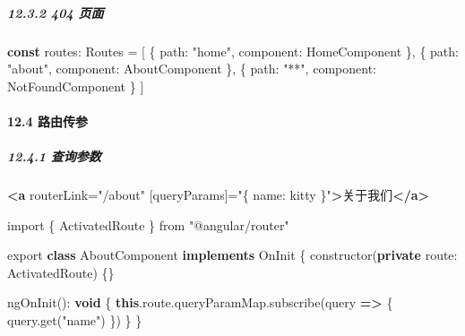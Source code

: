 \documentclass[
]{article}
\newenvironment{Shaded}{}{}
\newcommand{\AttributeTok}[1]{\textcolor[rgb]{0.49,0.56,0.16}{#1}}
\newcommand{\DataTypeTok}[1]{\textcolor[rgb]{0.56,0.13,0.00}{#1}}
\newcommand{\FunctionTok}[1]{\textcolor[rgb]{0.02,0.16,0.49}{#1}}
\newcommand{\ImportTok}[1]{#1}
\newcommand{\KeywordTok}[1]{\textcolor[rgb]{0.00,0.44,0.13}{\textbf{#1}}}
\newcommand{\NormalTok}[1]{#1}
\newcommand{\OperatorTok}[1]{\textcolor[rgb]{0.40,0.40,0.40}{#1}}
\newcommand{\OtherTok}[1]{\textcolor[rgb]{0.00,0.44,0.13}{#1}}
\newcommand{\StringTok}[1]{\textcolor[rgb]{0.25,0.44,0.63}{#1}}
\begin{document}
\hypertarget{1232-404-ux9875ux9762}{%
\subparagraph{12.3.2 404 页面}\label{1232-404-ux9875ux9762}}

\begin{Shaded}
\begin{Highlighting}[]
\KeywordTok{const}\NormalTok{ routes}\OperatorTok{:}\NormalTok{ Routes }\OperatorTok{=}\NormalTok{ [}
\NormalTok{  \{}
    \DataTypeTok{path}\OperatorTok{:} \StringTok{"home"}\OperatorTok{,}
    \DataTypeTok{component}\OperatorTok{:}\NormalTok{ HomeComponent}
\NormalTok{  \}}\OperatorTok{,}
\NormalTok{  \{}
    \DataTypeTok{path}\OperatorTok{:} \StringTok{"about"}\OperatorTok{,}
    \DataTypeTok{component}\OperatorTok{:}\NormalTok{ AboutComponent}
\NormalTok{  \}}\OperatorTok{,}
\NormalTok{  \{}
    \DataTypeTok{path}\OperatorTok{:} \StringTok{"**"}\OperatorTok{,}
    \DataTypeTok{component}\OperatorTok{:}\NormalTok{ NotFoundComponent}
\NormalTok{  \}}
\NormalTok{]}
\end{Highlighting}
\end{Shaded}

\hypertarget{124-ux8defux7531ux4f20ux53c2}{%
\paragraph{12.4 路由传参}\label{124-ux8defux7531ux4f20ux53c2}}

\hypertarget{1241-ux67e5ux8be2ux53c2ux6570}{%
\subparagraph{12.4.1 查询参数}\label{1241-ux67e5ux8be2ux53c2ux6570}}

\begin{Shaded}
\begin{Highlighting}[]
\KeywordTok{\textless{}a}\OtherTok{ routerLink=}\StringTok{"/about"}\OtherTok{ [queryParams]=}\StringTok{"\{ name: \textquotesingle{}kitty\textquotesingle{} \}"}\KeywordTok{\textgreater{}}\NormalTok{关于我们}\KeywordTok{\textless{}/a\textgreater{}}
\end{Highlighting}
\end{Shaded}

\begin{Shaded}
\begin{Highlighting}[]
\ImportTok{import}\NormalTok{ \{ ActivatedRoute \} }\ImportTok{from} \StringTok{"@angular/router"}

\ImportTok{export} \KeywordTok{class}\NormalTok{ AboutComponent }\KeywordTok{implements}\NormalTok{ OnInit \{}
  \FunctionTok{constructor}\NormalTok{(}\KeywordTok{private} \DataTypeTok{route}\OperatorTok{:}\NormalTok{ ActivatedRoute) \{\}}

  \FunctionTok{ngOnInit}\NormalTok{()}\OperatorTok{:} \KeywordTok{void}\NormalTok{ \{}
    \KeywordTok{this}\OperatorTok{.}\AttributeTok{route}\OperatorTok{.}\AttributeTok{queryParamMap}\OperatorTok{.}\FunctionTok{subscribe}\NormalTok{(query }\KeywordTok{=\textgreater{}}\NormalTok{ \{}
\NormalTok{      query}\OperatorTok{.}\FunctionTok{get}\NormalTok{(}\StringTok{"name"}\NormalTok{)}
\NormalTok{    \})}
\NormalTok{  \}}
\NormalTok{\}}
\end{Highlighting}
\end{Shaded}
\end{document}
